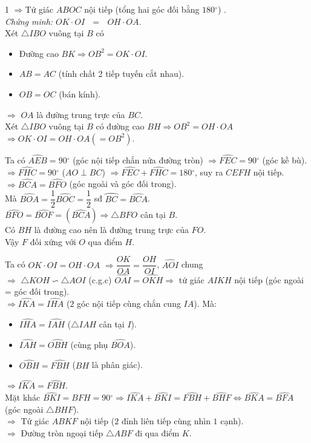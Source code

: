 \begin{bt}[3,0 điểm]
{\begin{enumEX}{1}
$\Rightarrow $Tứ giác $ABOC$ nội tiếp (tổng hai góc đối bằng $180{}^\circ $) .\\
\textit{Chứng minh: $OK\cdot OI\text{ }=\text{ }OH\cdot OA$.}\\
Xét $\triangle IBO$ vuông tại $B$ có
\begin{itemize}
\item Đường cao $BK \Rightarrow OB^2=OK\cdot OI$.
\item $AB=AC$ (tính chất 2 tiếp tuyến cắt nhau).
\item  $OB=OC$ (bán kính).
\end{itemize}
$\Rightarrow $ $OA$ là đường trung trực của $BC$.\\
Xét $\triangle IBO$ vuông tại $B$ có đường cao $BH \Rightarrow OB^2=OH\cdot OA$
 $\Rightarrow OK\cdot OI=OH\cdot OA \left( =OB^2\right)$.
\item
Ta có $\widehat{AEB}=90{}^\circ $ (góc nội tiếp chắn nửa đường tròn) $\Rightarrow \widehat{FEC}=90{}^\circ $ (góc kề bù).\\
$\Rightarrow \widehat{FHC}=90{}^\circ $ ($AO\perp BC$) $\Rightarrow \widehat{FEC}+\widehat{FHC}=180{}^\circ $, suy ra $CEFH$ nội tiếp.\\
$\Rightarrow \widehat{BCA}=\widehat{BFO}$ (góc ngoài và góc đối trong).\\
Mà $\widehat{BOA}=\dfrac{1}{2}\widehat{BOC}=\dfrac{1}{2}$ sđ $\wideparen{BC}=\widehat{BCA}$.\\
$\widehat{BFO}=\widehat{BOF}=\left( \widehat{BCA} \right)\Rightarrow \triangle BFO$ cân tại $B$. \\
Có $BH$ là đường cao nên là đường trung trực của $FO$.\\
Vậy $F$ đối xứng với $O$ qua điểm $H$.
\item Ta có $OK\cdot OI=OH\cdot OA$ $\Rightarrow \dfrac{OK}{OA}=\dfrac{OH}{OI}$, $\widehat{AOI}$ chung\\ $\Rightarrow $ $\triangle KOH\backsim \triangle AOI$ (c.g.c) $\widehat{OAI}=\widehat{OKH}\Rightarrow $ tứ giác $AIKH$ nội tiếp (góc ngoài = góc đối trong).\\
$\Rightarrow \widehat{IKA}=\widehat{IHA}$ ($2$ góc nội tiếp cùng chắn cung $IA$). Mà:
\begin{itemize}
\item $\widehat{IHA}=\widehat{IAH}$ ($\triangle IAH$ cân tại $I$).
\item $\widehat{IAH}=\widehat{OBH}$ (cùng phụ $\widehat{BOA}$). \item $\widehat{OBH}=\widehat{FBH}$ ($BH$ là phân giác).
\end{itemize}
 $\Rightarrow \widehat{IKA}=\widehat{FBH}$.\\
Mặt khác $\widehat{BKI}=\widehat{BFH}=90{}^\circ \Rightarrow \widehat{IKA}+\widehat{BKI}=\widehat{FBH}+\widehat{BHF}\Leftrightarrow \widehat{BKA}=\widehat{BFA}$ (góc ngoài $\triangle BHF$).\\
$\Rightarrow $ Tứ giác $ABKF$ nội tiếp ($2$ đỉnh liên tiếp cùng nhìn $1$ cạnh).\\
$\Rightarrow $ Đường tròn ngoại tiếp $\triangle ABF$ đi qua điểm $K$.
\end{enumEX}
}
\end{bt}